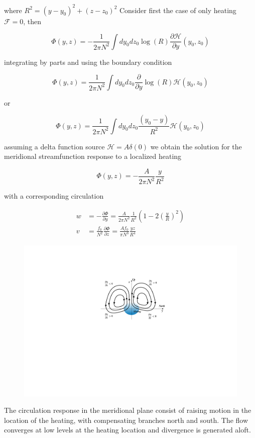 where \(R^2 = (y-y_0)^2 + (z-z_0)^2\) Consider first the case of only
heating \(\mathcal{F} = 0\), then

\[
\Phi(y,z) = -\frac{1}{2\pi N^2}\int dy_0 dz_0 \log( R)  \frac{\partial \mathcal{H}}{\partial y}(y_0,z_0)
\]

integrating by parts and using the boundary condition

\[\Phi(y,z) = \frac{1}{2\pi N^2}\int dy_0 dz_0 \frac{\partial }{\partial y}\log( R) \mathcal{H}(y_0,z_0)\]

or

\[\Phi(y,z) = \frac{1}{2\pi N^2}\int dy_0 dz_0 \frac{(y_0-y) }{R^2} \mathcal{H}(y_0,z_0)\]

assuming a delta function source \( \mathcal{H} = A \delta (0)\) we obtain
the solution for the meridional streamfunction response to a localized
heating

\[\Phi(y,z) = -\frac{A}{2\pi N^2} \frac{y}{R^2}\]

with a corresponding circulation

\[\begin{aligned}
w &= -\frac{\partial \Phi}{\partial y} =\frac{A}{2\pi N^2} \frac{1}{R^2}\left( 1 -2(\frac{y}{R})^2 \right) \\
v &= \frac{f_0}{N^2}\frac{\partial \Phi}{\partial z} =\frac{Af_0}{\pi N^3} \frac{y z}{R^4}
\end{aligned}\]

\begin{figure}
\centering
\includegraphics[width = .7 \textwidth]{figs/GD/Hforcing.png}
\caption{}
\end{figure}

The circulation response in the meridional plane consist of raising
motion in the location of the heating, with compensating branches north
and south. The flow converges at low levels at the heating location and
divergence is generated aloft.

